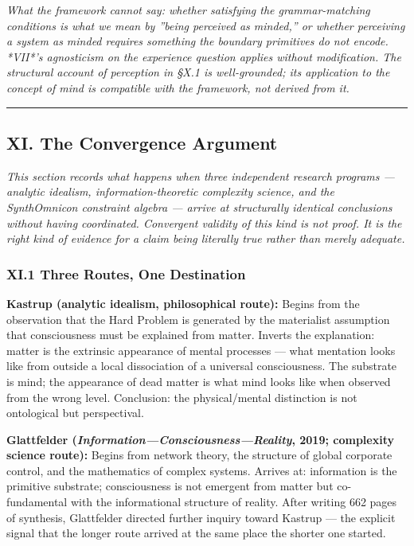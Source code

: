\documentclass[12pt,a4paper]{article}
\begin{document}
\emph{What the framework cannot say: whether satisfying the grammar-matching conditions is what we mean by ''being perceived as minded,'' or whether perceiving a system as minded requires something the boundary primitives do not encode. *VII*'s agnosticism on the experience question applies without modification. The structural account of perception in §X.1 is well-grounded; its application to the concept of mind is compatible with the framework, not derived from it.}

\begin{center}
\rule{0.5\textwidth}{0.4pt}
\end{center}

\subsection{XI. The Convergence Argument}

\emph{This section records what happens when three independent research programs --- analytic idealism, information-theoretic complexity science, and the SynthOmnicon constraint algebra --- arrive at structurally identical conclusions without having coordinated. Convergent validity of this kind is not proof. It is the right kind of evidence for a claim being literally true rather than merely adequate.}

\subsubsection{XI.1 Three Routes, One Destination}

\textbf{Kastrup (analytic idealism, philosophical route):} Begins from the observation that the Hard Problem is generated by the materialist assumption that consciousness must be explained from matter. Inverts the explanation: matter is the extrinsic appearance of mental processes --- what mentation looks like from outside a local dissociation of a universal consciousness. The substrate is mind; the appearance of dead matter is what mind looks like when observed from the wrong level. Conclusion: the physical/mental distinction is not ontological but perspectival.

\textbf{Glattfelder (\emph{Information---Consciousness---Reality}, 2019; complexity science route):} Begins from network theory, the structure of global corporate control, and the mathematics of complex systems. Arrives at: information is the primitive substrate; consciousness is not emergent from matter but co-fundamental with the informational structure of reality. After writing 662 pages of synthesis, Glattfelder directed further inquiry toward Kastrup --- the explicit signal that the longer route arrived at the same place the shorter one started.
\end{document}
